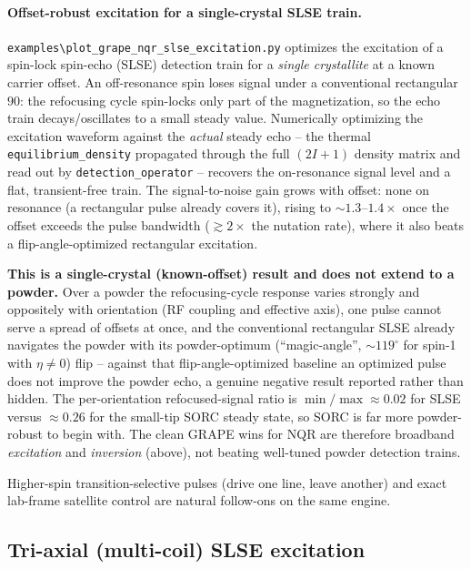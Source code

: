 \documentclass[11pt,oneside]{report}
\newcommand{\code}[1]{\texttt{#1}}
\begin{document}
\paragraph{Offset-robust excitation for a single-crystal SLSE train.}
\code{examples\textbackslash plot\_grape\_nqr\_slse\_excitation.py} optimizes the
excitation of a spin-lock spin-echo (SLSE) detection train for a \emph{single
crystallite} at a known carrier offset. An off-resonance spin loses signal under
a conventional rectangular \(90\): the refocusing cycle spin-locks only part of
the magnetization, so the echo train decays/oscillates to a small steady value.
Numerically optimizing the excitation waveform against the \emph{actual} steady
echo -- the thermal \code{equilibrium\_density} propagated through the full
\((2I+1)\) density matrix and read out by \code{detection\_operator} -- recovers
the on-resonance signal level and a flat, transient-free train. The
signal-to-noise gain grows with offset: none on resonance (a rectangular pulse
already covers it), rising to \(\sim 1.3\text{--}1.4\times\) once the offset
exceeds the pulse bandwidth (\(\gtrsim 2\times\) the nutation rate), where it also
beats a flip-angle-optimized rectangular excitation.

\textbf{This is a single-crystal (known-offset) result and does not extend to a
powder.} Over a powder the refocusing-cycle response varies strongly and
oppositely with orientation (RF coupling and effective axis), one pulse cannot
serve a spread of offsets at once, and the conventional rectangular SLSE already
navigates the powder with its powder-optimum (``magic-angle'', \(\sim 119^\circ\)
for spin-1 with \(\eta\neq 0\)) flip -- against that flip-angle-optimized
baseline an optimized pulse does not improve the powder echo, a genuine negative
result reported rather than hidden. The per-orientation refocused-signal ratio is
\(\min/\max\approx 0.02\) for SLSE versus \(\approx 0.26\) for the small-tip SORC
steady state, so SORC is far more powder-robust to begin with. The clean GRAPE
wins for NQR are therefore broadband \emph{excitation} and \emph{inversion}
(above), not beating well-tuned powder detection trains.

Higher-spin transition-selective pulses (drive one line, leave another) and
exact lab-frame satellite control are natural follow-ons on the same engine.

\subsection{Tri-axial (multi-coil) SLSE excitation}
\label{sec:grape-multi-axis}
\end{document}

